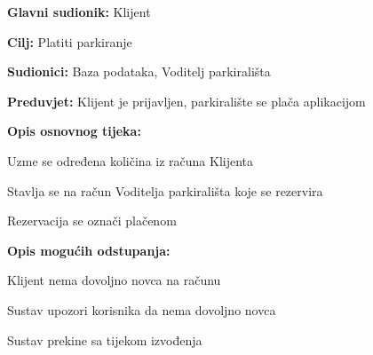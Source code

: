 						\noindent {}
					\begin{packed_item}
	
						\item \textbf{Glavni sudionik: }Klijent
						\item  \textbf{Cilj:} Platiti parkiranje
						\item  \textbf{Sudionici:} Baza podataka, Voditelj parkirališta
						\item  \textbf{Preduvjet:} Klijent je prijavljen, parkiralište se plača aplikacijom
						\item  \textbf{Opis osnovnog tijeka:}
						
						\item[] \begin{packed_enum}
	
							\item Uzme se određena količina iz računa Klijenta
							\item Stavlja se na račun Voditelja parkirališta koje se rezervira
							\item Rezervacija se označi plačenom 
							
							
						\end{packed_enum}

						\item  \textbf{Opis mogućih odstupanja:}
						
						\item[] \begin{packed_item}
	
							\item[1.a] Klijent nema dovoljno novca na računu
							\item[] \begin{packed_enum}
								
								\item Sustav upozori korisnika da nema dovoljno novca
								\item Sustav prekine sa tijekom izvođenja
								
								
							\end{packed_enum}
	
							
						\end{packed_item}	

					\end{packed_item}

